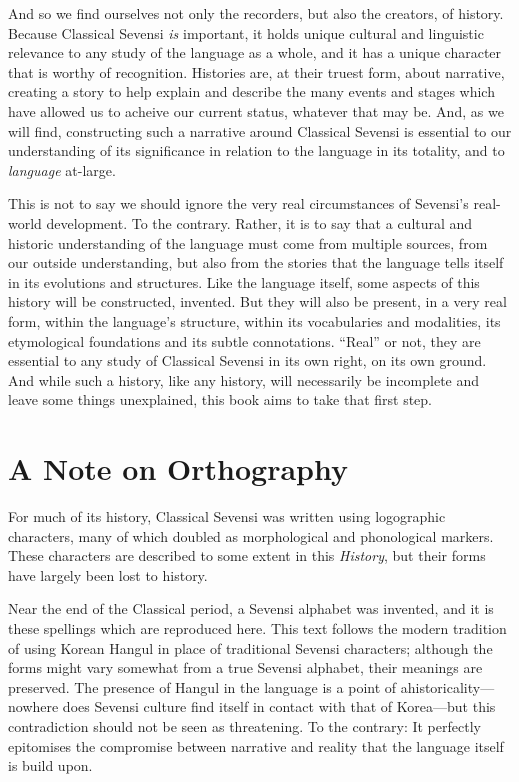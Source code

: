 And so we find ourselves not only the recorders, but also the creators, of history.
Because Classical Sevensi \emph{is} important, it holds unique cultural and linguistic relevance to any study of the language as a whole, and it has a unique character that is worthy of recognition.
Histories are, at their truest form, about narrative, creating a story to help explain and describe the many events and stages which have allowed us to acheive our current status, whatever that may be.
And, as we will find, constructing such a narrative around Classical Sevensi is essential to our understanding of its significance in relation to the language in its totality, and to \emph{language} at-large.

This is not to say we should ignore the very real circumstances of Sevensi's real-world development.
To the contrary.
Rather, it is to say that a cultural and historic understanding of the language must come from multiple sources, from our outside understanding, but also from the stories that the language tells itself in its evolutions and structures.
Like the language itself, some aspects of this history will be constructed, invented.
But they will also be present, in a very real form, within the language's structure, within its vocabularies and modalities, its etymological foundations and its subtle connotations.
“Real” or not, they are essential to any study of Classical Sevensi in its own right, on its own ground.
And while such a history, like any history, will necessarily be incomplete and leave some things unexplained, this book aims to take that first step.

\chapter*{A Note on Orthography} \label{orthography}

For much of its history, Classical Sevensi was written using logographic characters, many of which doubled as morphological and phonological markers.
These characters are described to some extent in this \emph{History}, but their forms have largely been lost to history.

Near the end of the Classical period, a Sevensi alphabet was invented, and it is these spellings which are reproduced here.
This text follows the modern tradition of using Korean Hangul in place of traditional Sevensi characters; although the forms might vary somewhat from a true Sevensi alphabet, their meanings are preserved.
The presence of Hangul in the language is a point of ahistoricality—nowhere does Sevensi culture find itself in contact with that of Korea—but this contradiction should not be seen as threatening.
To the contrary: It perfectly epitomises the compromise between narrative and reality that the language itself is build upon.


